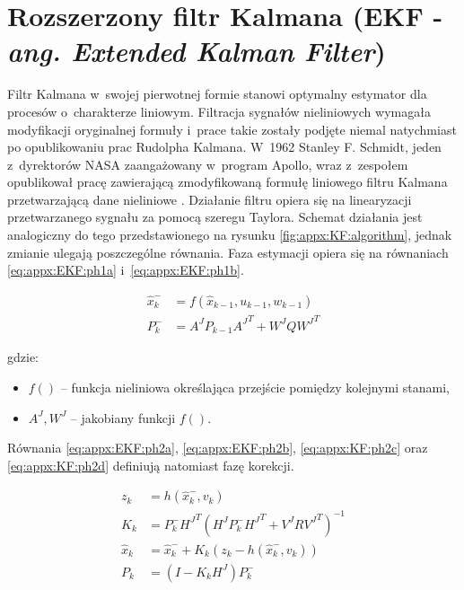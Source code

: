 \section*{Rozszerzony filtr Kalmana (EKF - \emph{ang. Extended Kalman Filter})}
\label{sec:appx:filters:EKF}
Filtr Kalmana w~swojej pierwotnej formie stanowi optymalny estymator dla procesów o~charakterze liniowym. Filtracja sygnałów nieliniowych wymagała modyfikacji oryginalnej formuły i~prace takie zostały podjęte niemal natychmiast po opublikowaniu prac Rudolpha Kalmana. W~1962 Stanley F. Schmidt, jeden z~dyrektorów NASA zaangażowany w~program Apollo, wraz z~zespołem opublikował pracę zawierającą zmodyfikowaną formułę liniowego filtru Kalmana przetwarzającą dane nieliniowe \cite{smith1962application}. Działanie filtru opiera się na linearyzacji przetwarzanego sygnału za pomocą szeregu Taylora. Schemat działania jest analogiczny do tego przedstawionego na rysunku \ref{fig:appx:KF:algorithm}, jednak zmianie ulegają poszczególne równania. Faza estymacji opiera się na równaniach \ref{eq:appx:EKF:ph1a} i~\ref{eq:appx:EKF:ph1b}.
		
\begin{subequations}
	\begin{align}
		\widehat{x}^-_k & = f(\widehat{x}_{k-1}, u_{k-1}, w_{k-1})\label{eq:appx:EKF:ph1a} \\
		P^-_k           & = A^J P_{k-1} {A^J}^T + W^J Q {W^J}^T \label{eq:appx:EKF:ph1b}   
	\end{align}
\end{subequations}
		
gdzie:
\begin{itemize}
	\item $f()$ -- funkcja nieliniowa określająca przejście pomiędzy kolejnymi stanami,
	\item $A^J , W^J$ -- jakobiany funkcji $f()$.
\end{itemize}
		
Równania \ref{eq:appx:EKF:ph2a}, \ref{eq:appx:EKF:ph2b}, \ref{eq:appx:KF:ph2c} oraz \ref{eq:appx:KF:ph2d} definiują natomiast fazę korekcji.
		
\begin{subequations}
	\begin{align}
		z_k           & = h(\widehat{x}^-_k, v_k) \label{eq:appx:EKF:ph2a}                                 \\
		K_k           & = P^-_{k}{H^J}^T(H^J P^-_{k}{H^J}^T + V^J R {V^J}^T)^{-1} \label{eq:appx:EKF:ph2b} \\
		\widehat{x}_k & = \widehat{x}^-_k + K_{k}(z_k-h(\widehat{x}^-_k, v_k))  \label{eq:appx:EKF:ph2c}   \\
		P_k           & = (I-K_{k}H^J)P^-_k \label{eq:appx:EKF:ph2d}                                       
	\end{align}
\end{subequations}
		
